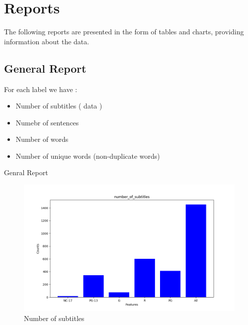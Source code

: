 \documentclass[a4paper]{article}
\begin{document}
\section{Reports}

The following reports are presented in the form of tables and charts, providing information about the data.

\subsection*{General Report}

For each label we have :

\begin{itemize}

    \item Number of subtitles ( data )
    \item Numebr of sentences
    \item Number of words
    \item Number of unique words (non-duplicate words)

\end{itemize}



\begin{table}[ht]
    \centering
    \caption{Genral Report}
    \label{tab:data}
\end{table}

\begin{figure}[ht]
    \centering
    \includegraphics[width=1\textwidth]{../stats/number_of_subtitles.png}
    \caption{Number of subtitles}
\end{figure}
\end{document}

